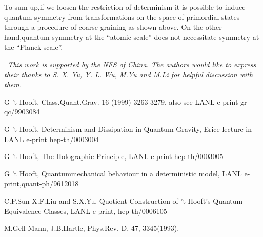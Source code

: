 \documentclass[a4paper,12pt]{article}
\begin{document}
To sum up,if we loosen the restriction of determinism it is possible to
induce quantum symmetry from transformations on the space of primordial
states through a procedure of coarse graining as shown above. On the other
hand,quantum symmetry at the ``atomic scale'' does not necessitate symmetry
at the ``Planck scale''.

\medskip

\noindent \textit{\ This work is supported by the NFS of China. The authors
would like to express their thanks to S. X. Yu, Y. L. Wu, M.Yu and M.Li for
helpful discussion with them.}

\begin{thebibliography}{9}
  G 't Hooft, Class.Quant.Grav. 16 (1999) 3263-3279, also see
LANL e-print gr-qc/9903084

  G 't Hooft, Determinism and Dissipation in Quantum Gravity,
Erice lecture in LANL e-print hep-th/0003004

  G 't Hooft, The Holographic Principle, LANL e-print
hep-th/0003005

  G 't Hooft, Quantummechanical behaviour in a deterministic
model, LANL e-print,quant-ph/9612018

  C.P.Sun X.F.Liu and S.X.Yu, Quotient Construction of 't Hooft's
Quantum Equivalence Classes, LANL e-print, hep-th/0006105

  M.Gell-Mann, J.B.Hartle, Phys.Rev. D, 47, 3345(1993).
\end{thebibliography}
\end{document}
